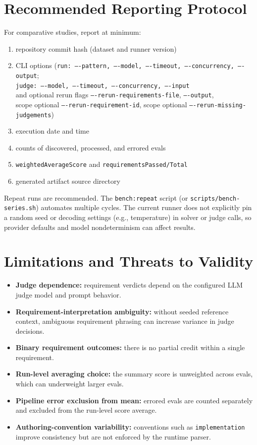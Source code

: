 \documentclass[11pt]{article}
\begin{document}
\section{Recommended Reporting Protocol}
For comparative studies, report at minimum:
\begin{enumerate}
  \item repository commit hash (dataset and runner version)
  \item CLI options (\texttt{run: ----pattern, ----model, ----timeout, ----concurrency, ----output}; \\\texttt{judge: ----model, ----timeout, ----concurrency, ----input} \\and optional rerun flags \texttt{----rerun-requirements-file}, \texttt{----output}, \\scope optional \texttt{----rerun-requirement-id}, scope optional \texttt{----rerun-missing-judgements})
  \item execution date and time
  \item counts of discovered, processed, and errored evals
  \item \texttt{weightedAverageScore} and \texttt{requirementsPassed/Total}
  \item generated artifact source directory
\end{enumerate}

Repeat runs are recommended. The \texttt{bench:repeat} script (or \texttt{scripts/bench-series.sh}) automates multiple cycles. The current runner does not explicitly pin a random seed or decoding settings (e.g., temperature) in solver or judge calls, so provider defaults and model nondeterminism can affect results.

\section{Limitations and Threats to Validity}
\begin{itemize}
  \item \textbf{Judge dependence:} requirement verdicts depend on the configured LLM judge model and prompt behavior.
  \item \textbf{Requirement-interpretation ambiguity:} without seeded reference context, ambiguous requirement phrasing can increase variance in judge decisions.
  \item \textbf{Binary requirement outcomes:} there is no partial credit within a single requirement.
  \item \textbf{Run-level averaging choice:} the summary score is unweighted across evals, which can underweight larger evals.
  \item \textbf{Pipeline error exclusion from mean:} errored evals are counted separately and excluded from the run-level score average.
  \item \textbf{Authoring-convention variability:} conventions such as \texttt{implementation} improve consistency but are not enforced by the runtime parser.
\end{itemize}
\end{document}

